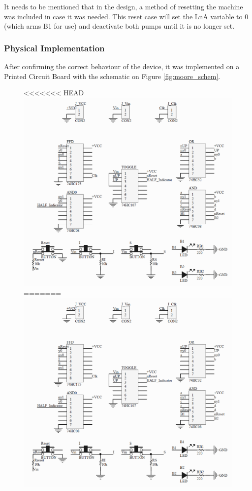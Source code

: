 It needs to be mentioned that in the design, a method of resetting the machine was included in case it was needed.
This reset case will set the LnA variable to 0 (which arms B1 for use) and deactivate both pumps until it is no longer
set.

\subsubsection{\color{orange}Physical Implementation}

After confirming the correct behaviour of the device, it was implemented on a Printed Circuit Board with the schematic
on Figure \ref{fig:moore_schem}.

\begin{figure}[H]
    \begin{center}
<<<<<<< HEAD
        \includegraphics[scale=0.5]{../Exercise1/Moore/report/schematic.png}
=======
        \includegraphics[width=\linewidth]{./schematic.png}

\end{center}
\end{figure}
